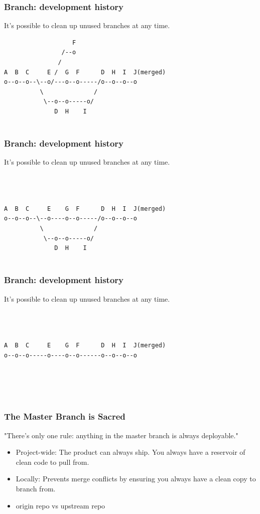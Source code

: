 \documentclass[unknownkeysallowed]{beamer}
\begin{document}
\begin{frame}[fragile]
	\frametitle{Branch: development history}
	It's possible to clean up unused branches at any time.
\begin{verbatim}
                   F
                /--o
               /
A  B  C     E /  G  F      D  H  I  J(merged)
o--o--o--\--o/---o--o-----/o--o--o--o
          \              /
           \--o--o-----o/
              D  H    I
                      
\end{verbatim}
\end{frame}

\begin{frame}[fragile]
	\frametitle{Branch: development history}
	It's possible to clean up unused branches at any time.
\begin{verbatim}
                   
                
               
A  B  C     E    G  F      D  H  I  J(merged)
o--o--o--\--o----o--o-----/o--o--o--o
          \              /
           \--o--o-----o/
              D  H    I
                      
\end{verbatim}
\end{frame}

\begin{frame}[fragile]
	\frametitle{Branch: development history}
	It's possible to clean up unused branches at any time.
\begin{verbatim}
                   
                
               
A  B  C     E    G  F      D  H  I  J(merged)
o--o--o-----o----o--o------o--o--o--o
          
          
          
                      
\end{verbatim}
\end{frame}

\begin{frame}
    \frametitle{The Master Branch is Sacred}
    "There's only one rule: anything in the master branch is always deployable."
    \begin{itemize}
        \item{Project-wide: The product can always ship. You always have a reservoir of clean code to pull from.}
        \item{Locally: Prevents merge conflicts by ensuring you always have a clean copy to branch from.}
        \item{origin repo vs upstream repo}
    \end{itemize}
    \vspace{1cm} %
\end{frame}
\end{document}

